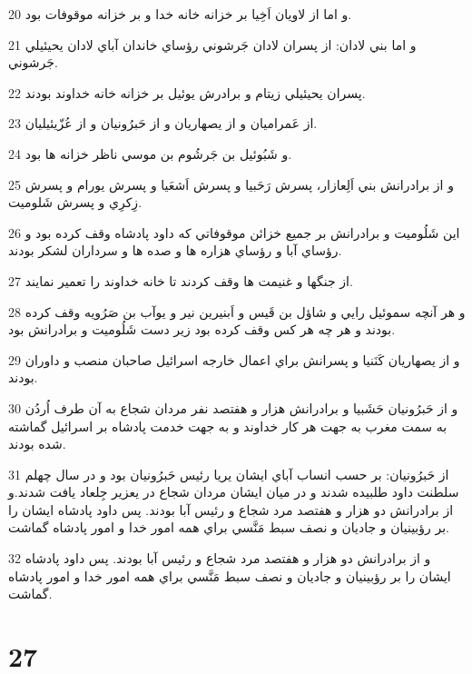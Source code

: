 \par 20 و اما از لاويان اَخِيا بر خزانه خانه خدا و بر خزانه موقوفات بود.
\par 21 و اما بني لادان: از پسران لادان جَرشوني رؤساي خاندان آباي لادان يحيئيلي جَرشوني.
\par 22 پسران يحيئيلي زيتام و برادرش يوئيل بر خزانه خانه خداوند بودند.
\par 23 از عَمراميان و از يصهاريان و از حَبرُونيان و از عُزّيئيليان.
\par 24 و شَبُوئيل بن جَرشُوم بن موسي ناظر خزانه ها بود.
\par 25 و از برادرانش بني اَلِعازار، پسرش رَحَبيا و پسرش اَشعَيا و پسرش يورام و پسرش زِکرِي و پسرش شَلوميت.
\par 26 اين شَلُوميت و برادرانش بر جميع خزائن موقوفاتي که داود پادشاه وقف کرده بود و رؤساي آبا و رؤساي هزاره ها و صده ها و سرداران لشکر بودند.
\par 27 از جنگها و غنيمت ها وقف کردند تا خانه خداوند را تعمير نمايند.
\par 28 و هر آنچه سموئيل رايي و شاؤل بن قَيس و اَبنيرين نير و يوآب بن صَرُويه وقف کرده بودند و هر چه هر کس وقف کرده بود زير دست شَلُوميت و برادرانش بود.
\par 29 و از يصهاريان کَنَنيا و پسرانش براي اعمال خارجه اسرائيل صاحبان منصب و داوران بودند.
\par 30 و از حَبرُونيان حَشَبيا و برادرانش هزار و هفتصد نفر مردان شجاع به آن طرف اُردُن به سمت مغرب به جهت هر کار خداوند و به جهت خدمت پادشاه بر اسرائيل گماشته شده بودند.
\par 31 از حَبرُونيان: بر حسب انساب آباي ايشان يريا رئيس حَبرُونيان بود و در سال چهلم سلطنت داود طلبيده شدند و در ميان ايشان مردان شجاع در يعزير جِلعاد يافت شدند.و از برادرانش دو هزار و هفتصد مرد شجاع و رئيس آبا بودند. پس داود پادشاه ايشان را بر رؤبينيان و جاديان و نصف سبط مَنَّسي براي همه امور خدا و امور پادشاه گماشت.
\par 32 و از برادرانش دو هزار و هفتصد مرد شجاع و رئيس آبا بودند. پس داود پادشاه ايشان را بر رؤبينيان و جاديان و نصف سبط مَنَّسي براي همه امور خدا و امور پادشاه گماشت.
 
\chapter{27}

